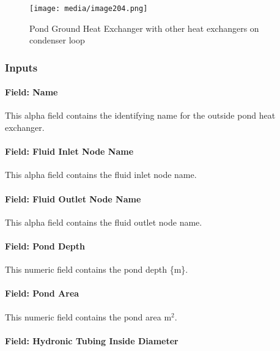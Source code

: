 \begin{figure}[hbtp] %
\centering
\texttt{[image: media/image204.png]}
\caption{Pond Ground Heat Exchanger with other heat exchangers on condenser loop \protect \label{fig:pond-ground-heat-exchanger-with-other-heat}}
\end{figure}

\subsubsection{Inputs}\label{inputs-12-002}

\paragraph{Field: Name}\label{field-name-11-002}

This alpha field contains the identifying name for the outside pond heat exchanger.

\paragraph{Field: Fluid Inlet Node Name}\label{field-fluid-inlet-node-name}

This alpha field contains the fluid inlet node name.

\paragraph{Field: Fluid Outlet Node Name}\label{field-fluid-outlet-node-name}

This alpha field contains the fluid outlet node name.

\paragraph{Field: Pond Depth}\label{field-pond-depth}

This numeric field contains the pond depth \{m\}.

\paragraph{Field: Pond Area}\label{field-pond-area}

This numeric field contains the pond area m\(^{2}\).

\paragraph{Field: Hydronic Tubing Inside Diameter}\label{field-hydronic-tubing-inside-diameter}

